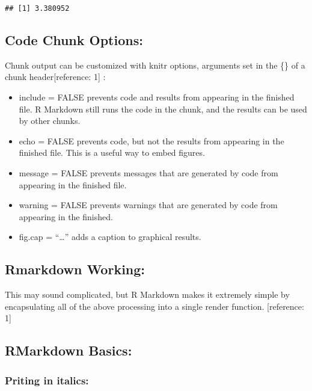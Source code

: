 \documentclass[]{article}
\providecommand{\tightlist}{%
  \setlength{\itemsep}{0pt}\setlength{\parskip}{0pt}}
\begin{document}
\begin{verbatim}
## [1] 3.380952
\end{verbatim}

\hypertarget{code-chunk-options}{%
\subsection{Code Chunk Options:}\label{code-chunk-options}}

Chunk output can be customized with knitr options, arguments set in the
\{\} of a chunk header{[}reference: 1{]} :

\begin{itemize}
\tightlist
\item
  include = FALSE prevents code and results from appearing in the
  finished file. R Markdown still runs the code in the chunk, and the
  results can be used by other chunks.\\
\item
  echo = FALSE prevents code, but not the results from appearing in the
  finished file. This is a useful way to embed figures.\\
\item
  message = FALSE prevents messages that are generated by code from
  appearing in the finished file.\\
\item
  warning = FALSE prevents warnings that are generated by code from
  appearing in the finished.\\
\item
  fig.cap = ``\ldots{}'' adds a caption to graphical results.
\end{itemize}

\hypertarget{rmarkdown-working}{%
\subsection{Rmarkdown Working:}\label{rmarkdown-working}}

This may sound complicated, but R Markdown makes it extremely simple by
encapsulating all of the above processing into a single render function.
{[}reference: 1{]}

\hypertarget{rmarkdown-basics}{%
\subsection{RMarkdown Basics:}\label{rmarkdown-basics}}

\hypertarget{priting-in-italics}{%
\subsubsection{Priting in italics:}\label{priting-in-italics}}
\end{document}
